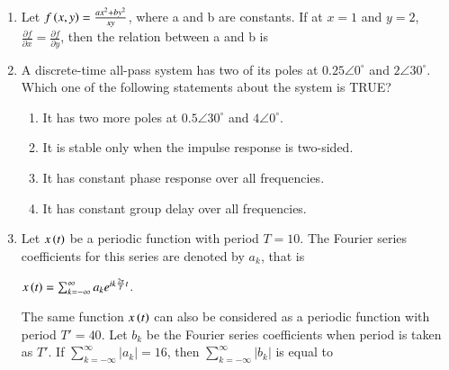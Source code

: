\documentclass[a4paper, 11pt]{article}
\begin{document}
\begin{enumerate}
    \hfill{}

    \item Let $f\left(x,y\right) = \frac{ax^2+by^2}{xy}$, where a and b are constants. If at $x=1$ and $y=2$, $\frac{\partial f}{\partial x} = \frac{\partial f}{\partial y}$, then the relation between a and b is
    \begin{enumerate}
    \end{enumerate}

    \hfill{}

    \item A discrete-time all-pass system has two of its poles at $0.25\angle0^{\circ}$ and $2\angle30^{\circ}$. Which one of the following statements about the system is TRUE?
    \begin{enumerate}
        \item It has two more poles at $0.5\angle30^{\circ}$ and $4\angle0^{\circ}$.
        \item It is stable only when the impulse response is two-sided.
        \item It has constant phase response over all frequencies.
        \item It has constant group delay over all frequencies.
    \end{enumerate}

    \hfill{}
    
    \item Let $x\left(t\right)$ be a periodic function with period $T=10$. The Fourier series coefficients for this series are denoted by $a_k$, that is
    \begin{center}
        $x\left(t\right) = \sum_{k=-\infty}^{\infty} a_k e^{ik\frac{2\pi}{T}t}$. 
    \end{center}
    The same function $x\left(t\right)$ can also be considered as a periodic function with period $T' = 40$. Let $b_k$ be the Fourier series coefficients when period is taken as $T'$. If $\sum_{k=-\infty}^{\infty} |a_k| = 16$, then $\sum_{k=-\infty}^{\infty} |b_k|$ is equal to
    \begin{enumerate}
    \end{enumerate}


\end{enumerate}
\end{document}
